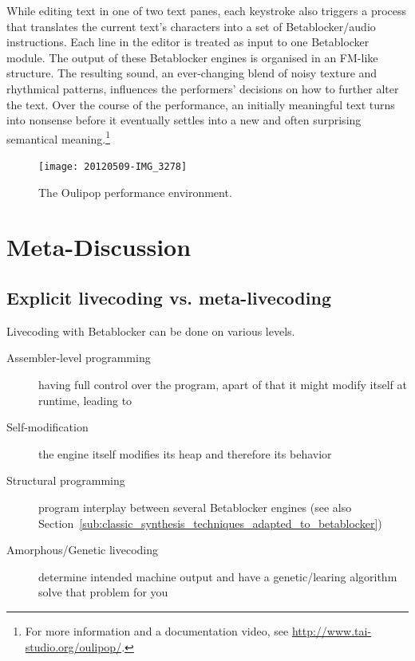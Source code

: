 \documentclass[letterpaper, 12pt]{article}
\begin{document}
While editing text in one of two text panes, each keystroke also triggers a process that translates the current text's characters into a set of Betablocker/audio instructions. 
Each line in the editor is treated as input to one Betablocker module.
The output of these Betablocker engines is organised in an FM-like structure. 
The resulting sound, an ever-changing blend of noisy texture and rhythmical patterns, influences the performers' decisions on how to further alter the text. 
Over the course of the performance, an initially meaningful text turns into nonsense before it eventually settles into a new and often surprising semantical meaning.\footnote{For more information and a documentation video, see \url{http://www.tai-studio.org/oulipop/}.}
\begin{figure}
	\centering
		\texttt{[image: 20120509-IMG\_3278]}
	\caption{The Oulipop performance environment.}
	\label{fig:fig_20120509-IMG_3278}
\end{figure}



\section{Meta-Discussion}
\label{sec:meta}


\subsection{Explicit livecoding vs. meta-livecoding} 
\label{sub:explicit_livecoding_meta_livecoding}



Livecoding with Betablocker can be done on various levels.
\begin{description}
	\item[Assembler-level programming] having full control over the program, apart of that it might modify itself at runtime, leading to
	\item[Self-modification] the engine itself modifies its heap and therefore its behavior
	\item[Structural programming] program interplay between several Betablocker engines (see also Section~\ref{sub:classic_synthesis_techniques_adapted_to_betablocker})
	\item[Amorphous/Genetic livecoding] determine intended machine output and have a genetic/learing algorithm solve that problem for you
\end{description}
\end{document}
